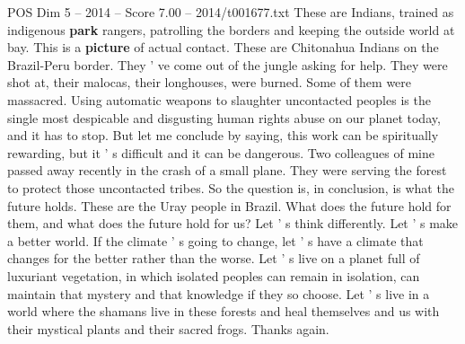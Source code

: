 \begin{textsample}{POS Dim 5 – 2014 – Score 7.00 – 2014/t001677.txt}
These are Indians, trained as indigenous \textbf{park} rangers, patrolling the borders and keeping the outside world at bay.
This is a \textbf{picture} of actual contact.
These are Chitonahua Indians on the Brazil-Peru border.
They ' ve come out of the jungle asking for help.
They were shot at, their malocas, their longhouses, were burned.
Some of them were massacred.
Using automatic weapons to slaughter uncontacted peoples is the single most despicable and disgusting human rights abuse on our planet today, and it has to stop.
But let me conclude by saying, this work can be spiritually rewarding, but it ' s difficult and it can be dangerous.
Two colleagues of mine passed away recently in the crash of a small plane.
They were serving the forest to protect those uncontacted tribes.
So the question is, in conclusion, is what the future holds.
These are the Uray people in Brazil.
What does the future hold for them, and what does the future hold for us?
Let ' s think differently.
Let ' s make a better world.
If the climate ' s going to change, let ' s have a climate that changes for the better rather than the worse.
Let ' s live on a planet full of luxuriant vegetation, in which isolated peoples can remain in isolation, can maintain that mystery and that knowledge if they so choose.
Let ' s live in a world where the shamans live in these forests and heal themselves and us with their mystical plants and their sacred frogs.
Thanks again.

\end{textsample}
